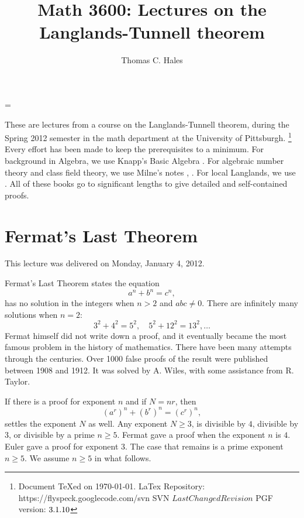 \documentclass{amsart}
\def\svninfo{%
  \noindent
  Document TeXed on \today. \hfill\break
  LaTex Repository: https://flyspeck.googlecode.com/svn \hfill\break
  SVN $LastChangedRevision$\hfill\break
  PGF version: $\pgftypesetversion$
  }
\begin{document}
\title{Math 3600: Lectures on the Langlands-Tunnell theorem}
\author{Thomas C. Hales}
\maketitle




\parindent=0pt
\parskip=\baselineskip
\def\seg{~~~}
\def\text{\hbox}

These are lectures from a course on the Langlands-Tunnell theorem, during
the Spring 2012 semester in the math department at the University of Pittsburgh.%
\footnote{\svninfo}
Every effort has been made to keep the prerequisites to a minimum.
For background in Algebra, we use Knapp's Basic Algebra \cite{knapp-basic}.
For algebraic number theory and class field theory, 
we use Milne's notes 
\cite{ANT}, \cite{CFT}.  For local Langlands, we use \cite{bushnell-henniart}.
All of these books go to significant lengths to give detailed and self-contained 
proofs.

\section{Fermat's Last Theorem}

This lecture was delivered on Monday, January 4, 2012.

Fermat's Last Theorem \cite{DDT} states the equation
\[
a^n + b^n = c^n,
\]
has no solution in the integers when $n>2$ and $abc\ne 0$.  There are
infinitely many solutions when $n=2$:
\[
3^2 + 4^2 = 5^2,\quad 5^2 + 12^2 = 13^2, \ldots
\]
Fermat himself did not write down a proof, and it eventually became
the most famous problem in the history of mathematics.  There have
been many attempts through the centuries.  Over 1000 false proofs of
the result were published between 1908 and 1912.  It was solved by
A. Wiles, with some assistance from R. Taylor.

If there is a proof for exponent $n$ and if $N = n r$, then
\[
(a^r)^n + (b^r)^n = (c^r)^n,
\]
settles the exponent $N$ as well.  Any exponent $N\ge3$, is divisible
by $4$, divisible by $3$, or divisible by a prime $n\ge 5$.  Fermat
gave a proof when the exponent $n$ is $4$.  Euler gave a proof for
exponent $3$.  The case that remains is a prime exponent $n\ge 5$.  We
assume $n\ge5$ in what follows.
\end{document}
